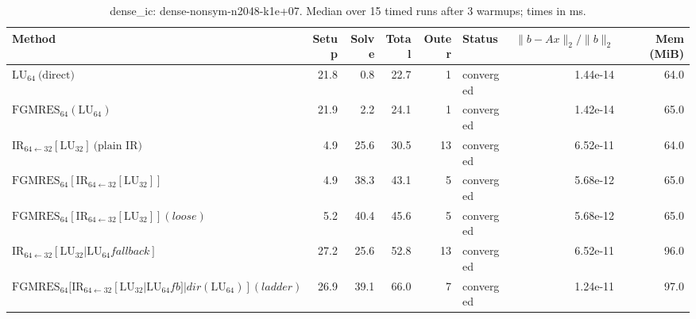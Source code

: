 \begin{table}[t]
\centering
\small
\caption{dense_ic: dense-nonsym-n2048-k1e+07. Median over 15 timed runs after 3 warmups; times in ms.}
\label{tab:dense_ic-dense-nonsym-n2048-k1e+07}
\begin{tabular}{lrrrrlrr}
\hline
Method & Setup & Solve & Total & Outer & Status & $\|b-Ax\|_2/\|b\|_2$ & Mem (MiB) \\
\hline
$\mathrm{LU}_{64}\ \text{(direct)}$ & 21.8 & 0.8 & 22.7 & 1 & converged & 1.44e-14 & 64.0 \\
$\mathrm{FGMRES}_{64}(\mathrm{LU}_{64})$ & 21.9 & 2.2 & 24.1 & 1 & converged & 1.42e-14 & 65.0 \\
$\mathrm{IR}_{64\leftarrow 32}[\mathrm{LU}_{32}]\ \text{(plain IR)}$ & 4.9 & 25.6 & 30.5 & 13 & converged & 6.52e-11 & 64.0 \\
$\mathrm{FGMRES}_{64}[\mathrm{IR}_{64\leftarrow 32}[\mathrm{LU}_{32}]]$ & 4.9 & 38.3 & 43.1 & 5 & converged & 5.68e-12 & 65.0 \\
$\mathrm{FGMRES}_{64}[\mathrm{IR}_{64\leftarrow 32}[\mathrm{LU}_{32}]] (loose)$ & 5.2 & 40.4 & 45.6 & 5 & converged & 5.68e-12 & 65.0 \\
$\mathrm{IR}_{64\leftarrow 32}[\mathrm{LU}_{32} | \mathrm{LU}_{64} fallback]$ & 27.2 & 25.6 & 52.8 & 13 & converged & 6.52e-11 & 96.0 \\
$\mathrm{FGMRES}_{64}[\mathrm{IR}_{64\leftarrow 32}[\mathrm{LU}_{32}|\mathrm{LU}_{64} fb]|dir(\mathrm{LU}_{64})] (ladder)$ & 26.9 & 39.1 & 66.0 & 7 & converged & 1.24e-11 & 97.0 \\
\hline
\end{tabular}
\end{table}
